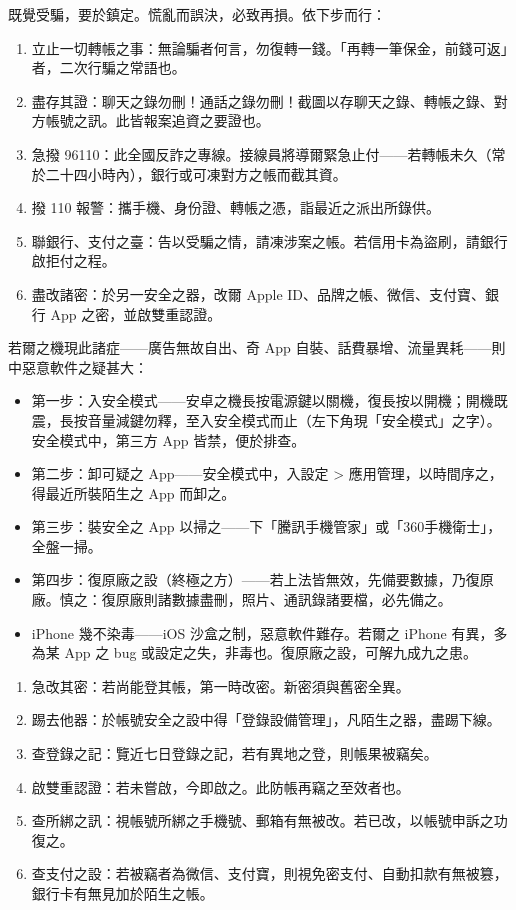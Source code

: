 既覺受騙，要於鎮定。慌亂而誤決，必致再損。依下步而行：

\begin{enumerate}
  \item 立止一切轉帳之事：無論騙者何言，勿復轉一錢。「再轉一筆保金，前錢可返」者，二次行騙之常語也。
  \item 盡存其證：聊天之錄勿刪！通話之錄勿刪！截圖以存聊天之錄、轉帳之錄、對方帳號之訊。此皆報案追資之要證也。
  \item 急撥 96110：此全國反詐之專線。接線員將導爾緊急止付——若轉帳未久（常於二十四小時內），銀行或可凍對方之帳而截其資。
  \item 撥 110 報警：攜手機、身份證、轉帳之憑，詣最近之派出所錄供。
  \item 聯銀行、支付之臺：告以受騙之情，請凍涉案之帳。若信用卡為盜刷，請銀行啟拒付之程。
  \item 盡改諸密：於另一安全之器，改爾 Apple ID、品牌之帳、微信、支付寶、銀行 App 之密，並啟雙重認證。
\end{enumerate}


若爾之機現此諸症——廣告無故自出、奇 App 自裝、話費暴增、流量異耗——則中惡意軟件之疑甚大：

\begin{itemize}
  \item 第一步：入安全模式——安卓之機長按電源鍵以關機，復長按以開機；開機既震，長按音量減鍵勿釋，至入安全模式而止（左下角現「安全模式」之字）。安全模式中，第三方 App 皆禁，便於排查。
  \item 第二步：卸可疑之 App——安全模式中，入設定 > 應用管理，以時間序之，得最近所裝陌生之 App 而卸之。
  \item 第三步：裝安全之 App 以掃之——下「騰訊手機管家」或「360手機衛士」，全盤一掃。
  \item 第四步：復原廠之設（終極之方）——若上法皆無效，先備要數據，乃復原廠。慎之：復原廠則諸數據盡刪，照片、通訊錄諸要檔，必先備之。
  \item iPhone 幾不染毒——iOS 沙盒之制，惡意軟件難存。若爾之 iPhone 有異，多為某 App 之 bug 或設定之失，非毒也。復原廠之設，可解九成九之患。
\end{itemize}


\begin{enumerate}
  \item 急改其密：若尚能登其帳，第一時改密。新密須與舊密全異。
  \item 踢去他器：於帳號安全之設中得「登錄設備管理」，凡陌生之器，盡踢下線。
  \item 查登錄之記：覽近七日登錄之記，若有異地之登，則帳果被竊矣。
  \item 啟雙重認證：若未嘗啟，今即啟之。此防帳再竊之至效者也。
  \item 查所綁之訊：視帳號所綁之手機號、郵箱有無被改。若已改，以帳號申訴之功復之。
  \item 查支付之設：若被竊者為微信、支付寶，則視免密支付、自動扣款有無被篡，銀行卡有無見加於陌生之帳。
\end{enumerate}

